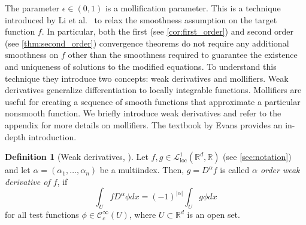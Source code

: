 \documentclass[12pt]{article}
\theoremstyle{definition}
\newtheorem{definition}[definition]{Definition}
\numberwithin{equation}{section}
\newcommand{\R}{\mathbb{R}}
\newcommand{\CL}{\mathcal{L}}
\newcommand{\CC}{\mathcal{C}}
\begin{document}
The parameter $\epsilon \in (0,1)$ is a mollification parameter. This is a technique introduced by Li et al.\ \cite{liStochasticModifiedEquations2019} to relax the smoothness assumption on the target function $f$. In particular, both the first (see \autoref{cor:first_order}) and second order (see \autoref{thm:second_order})  convergence theorems do not require any additional smoothness on $f$ other than the smoothness required to guarantee the existence and uniqueness of solutions to the modified equations.
To understand this technique they introduce two concepts: weak derivatives and mollifiers. Weak derivatives generalize differentiation to locally integrable functions. Mollifiers are useful for creating a sequence of smooth functions that approximate a particular nonsmooth function. We briefly introduce weak derivatives and refer to the appendix for more details on mollifiers. The textbook by Evans \cite[pp.~629]{evansPartialDifferentialEquations2010} provides an in-depth introduction.
\begin{definition}[Weak derivatives, ]
  \label{def:weak_derivatives}
  Let $f,g \in \CL^1_{\text{loc}}(\R^d, \R)$ (see \autoref{sec:notation}) and let $\alpha = (\alpha_1, \dots, \alpha_n)$ be a multiindex. Then, $g = D^{\alpha} f$ is called \emph{$\alpha$ order weak derivative of $f$}, if
  \begin{equation}
    \label{eq:weak_derivative}
    \int_U f D^{\alpha} \phi dx = (-1)^{|\alpha|} \int_U g \phi dx
  \end{equation}
  for all test functions $\phi \in \CC_c^{\infty}(U)$, where $U \subset \R^d$ is an open set.
\end{definition}
\end{document}

